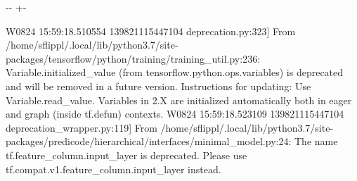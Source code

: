 \documentclass[letterpaper,10pt,english]{sphinxmanual}
\newlength\nbsphinxcodecellspacing
\begin{document}
%
{
\kern-\sphinxverbatimsmallskipamount\kern-\baselineskip
\kern+\FrameHeightAdjust\kern-\fboxrule
\vspace{\nbsphinxcodecellspacing}
%
\begin{sphinxVerbatim}[commandchars=\\\{\}]
W0824 15:59:18.510554 139821115447104 deprecation.py:323] From /home/sflippl/.local/lib/python3.7/site-packages/tensorflow/python/training/training\_util.py:236: Variable.initialized\_value (from tensorflow.python.ops.variables) is deprecated and will be removed in a future version.
Instructions for updating:
Use Variable.read\_value. Variables in 2.X are initialized automatically both in eager and graph (inside tf.defun) contexts.
W0824 15:59:18.523109 139821115447104 deprecation\_wrapper.py:119] From /home/sflippl/.local/lib/python3.7/site-packages/predicode/hierarchical/interfaces/minimal\_model.py:24: The name tf.feature\_column.input\_layer is deprecated. Please use tf.compat.v1.feature\_column.input\_layer instead.


\end{sphinxVerbatim}}
\end{document}
